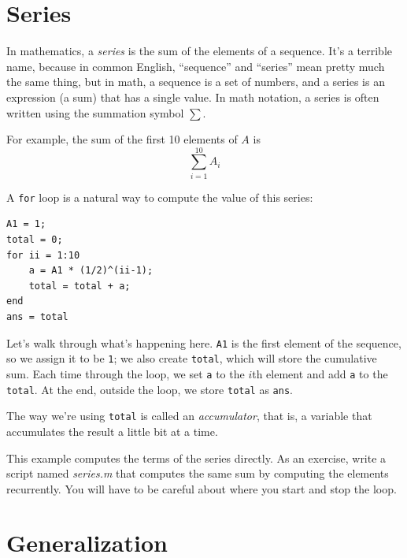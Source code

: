 \section{Series}
\label{series}

In mathematics, a \emph{series} is the sum of the elements of a sequence.  It's a terrible name, because in common English, ``sequence'' and ``series'' mean pretty much the same thing, but in math, a sequence is a set of numbers, and a series is an expression (a sum) that has a single value.  In math notation,  a series is often written using the summation symbol $\sum$.


For example, the sum of the first 10 elements of $A$ is
\begin{equation*}
\sum_{i=1}^{10} A_i
\end{equation*}

A \lstinline{for} loop is a natural way to compute the value of this series:

\begin{lstlisting}[caption={A program that calculates a simple series}, label={lst:series_10}]
A1 = 1;
total = 0;
for ii = 1:10
    a = A1 * (1/2)^(ii-1);
    total = total + a;
end
ans = total
\end{lstlisting}

Let's walk through what's happening here. \lstinline{A1} is the first element of the sequence, so we assign it to be \lstinline{1}; we also create \lstinline{total}, which will store the cumulative sum.
Each time through the loop, we set \lstinline{a} to the $i$th element and add \lstinline{a} to the \lstinline{total}.
At the end, outside the loop, we store  \lstinline{total} as \lstinline{ans}.

The way we're using \lstinline{total} is called an \emph{accumulator}, that is, a variable that accumulates the result a little bit at a time.



\begin{ex}
This example computes the terms of the series directly. As
an exercise, write a script named \emph{series.m} that computes
the same sum by computing the elements recurrently.  You will
have to be careful about where you start and stop the loop.
\end{ex}


\section{Generalization}

